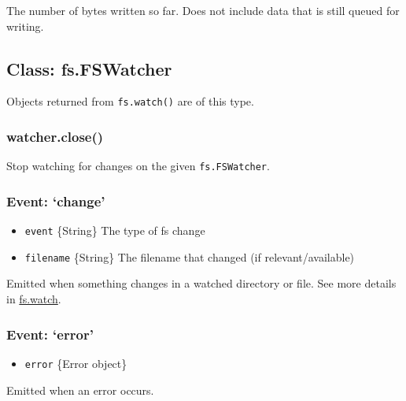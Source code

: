 The number of bytes written so far. Does not include data that is still
queued for writing.

\subsection{Class: fs.FSWatcher}

Objects returned from \texttt{fs.watch()} are of this type.

\subsubsection{watcher.close()}

Stop watching for changes on the given \texttt{fs.FSWatcher}.

\subsubsection{Event: `change'}

\begin{itemize}
\item
  \texttt{event} \{String\} The type of fs change
\item
  \texttt{filename} \{String\} The filename that changed (if
  relevant/available)
\end{itemize}

Emitted when something changes in a watched directory or file. See more
details in
\hyperref[fs\_fs\_watch\_filename\_options\_listener]{fs.watch}.

\subsubsection{Event: `error'}

\begin{itemize}
\item
  \texttt{error} \{Error object\}
\end{itemize}

Emitted when an error occurs.
